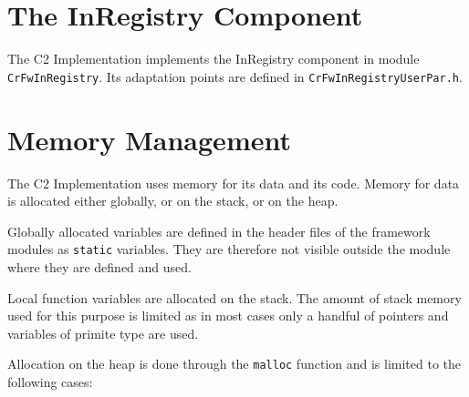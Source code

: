 \documentclass[a4paper,10pt]{article}
\let\stdsection\section
\renewcommand\section{\newpage\stdsection}
\begin{document}
\section{The InRegistry Component}\label{sec:InRegistry}


The C2 Implementation implements the InRegistry component in module \texttt{CrFwInRegistry}. Its adaptation points are defined in \texttt{CrFwInRegistryUserPar.h}.


\section{Memory Management}\label{sec:MemMng}

The C2 Implementation uses memory for its data and its code. Memory for data is allocated either globally, or on the stack, or on the heap.

Globally allocated variables are defined in the header files of the framework modules as \texttt{static} variables. They are therefore not visible outside the module where they are defined and used.

Local function variables are allocated on the stack. The amount of stack memory used for this purpose is limited as in most cases only a handful of pointers and variables of primite type are used.

Allocation on the heap is done through the \texttt{malloc} function and is limited to the following cases:
\end{document}
